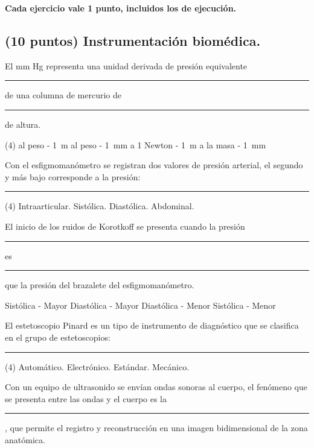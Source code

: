 \documentclass[12pt, letter]{exam}
\begin{document}

\setcounter{page}{3}

\newpage
\begin{center}
\textbf{Cada ejercicio vale 1 punto, incluidos los de ejecución.}
\end{center}

\begin{questions}

    \section{(10 puntos) Instrumentación biomédica.}

    \question El mm Hg representa una unidad derivada de presión equivalente \rule{2cm}{0.1mm} de una columna de mercurio de \rule{2cm}{0.1mm} de altura.
    \begin{tasks}(4)
        \task al peso - \SI{1}{\meter}
        \task al peso - \SI{1}{\milli\meter}
        \task a 1 Newton - \SI{1}{\meter}
        \task a la masa - \SI{1}{\milli\meter}
    \end{tasks}
    \question Con el esfigmomanómetro se registran dos valores de presión arterial, el segundo y más bajo corresponde a la presión: \rule{2cm}{0.1mm}
    \begin{tasks}(4)
        \task Intraarticular.
        \task Sistólica.
        \task Diastólica.
        \task Abdominal.
    \end{tasks}
    \question El inicio de los ruidos de Korotkoff se presenta cuando la presión \rule{2cm}{0.1mm} es \rule{2cm}{0.1mm} que la presión del brazalete del esfigmomanómetro.
    \begin{multicols}{2}
    \begin{tasks}
        \task Sistólica - Mayor
        \task Diastólica - Mayor
        \task Diastólica - Menor
        \task Sistólica - Menor
    \end{tasks}
    \end{multicols}
    \question El estetoscopio Pinard es un tipo de instrumento de diagnóstico que se clasifica en el grupo de estetoscopios: \rule{2cm}{0.1mm}
    \begin{tasks}(4)
        \task Automático.
        \task Electrónico.
        \task Estándar.
        \task Mecánico.
    \end{tasks}
    \question Con un equipo de ultrasonido se envían ondas sonoras al cuerpo, el fenómeno que se presenta entre las ondas y el cuerpo es la \rule{2cm}{0.1mm}, que permite el registro y reconstrucción en una imagen bidimensional de la zona anatómica.

\end{questions}
\end{document}
